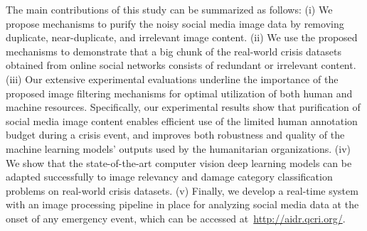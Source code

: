 \documentclass{iscram}
\begin{document}

The main contributions of this study can be summarized as follows: (i) We propose mechanisms to purify the noisy social media image data by removing duplicate, near-duplicate, and irrelevant image content. (ii) We use the proposed mechanisms to demonstrate that a big chunk of the real-world crisis datasets obtained from online social networks consists of redundant or irrelevant content. (iii) Our extensive experimental evaluations underline the importance of the proposed image filtering mechanisms for optimal utilization of both human and machine resources. Specifically, our experimental results show that purification of social media image content enables efficient use of the limited human annotation budget during a crisis event, and improves both robustness and quality of the machine learning models' outputs used by the humanitarian organizations. (iv) We show that the state-of-the-art computer vision deep learning models can be adapted successfully to image relevancy and damage category classification problems on real-world crisis datasets. (v) Finally, we develop a real-time system with an image processing pipeline in place for analyzing social media data at the onset of any emergency event, which can be accessed at~\url{http://aidr.qcri.org/}.
\end{document}
